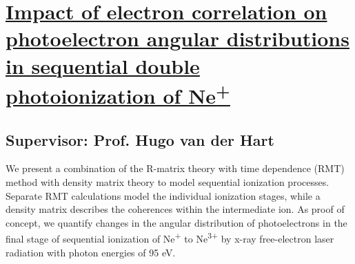 \section{\href{https://doi.org/10.1103/rwhj-df31}{Impact of electron 
correlation on photoelectron angular distributions in sequential double 
photoionization of Ne\textsuperscript{+}}}

\subsection*{Supervisor: Prof. Hugo van der Hart}



We present a combination of the R-matrix theory with time dependence (RMT) 
method with density matrix theory to model sequential ionization processes. 
Separate RMT calculations model the individual ionization stages, while a 
density matrix describes the coherences within the intermediate ion. As proof 
of concept, we quantify changes in the angular distribution of photoelectrons 
in the final stage of sequential ionization of Ne\textsuperscript{+}
to Ne\textsuperscript{3+} by x-ray free-electron laser radiation with photon 
energies of 95 eV.
